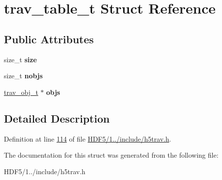 \hypertarget{structtrav__table__t}{}\section{trav\+\_\+table\+\_\+t Struct Reference}
\label{structtrav__table__t}
\subsection*{Public Attributes}
\begin{DoxyCompactItemize}
\item 
\mbox{\label{structtrav__table__t_a9df9cad12b6a3f75e5fd8242932d744b}} 
size\+\_\+t {\bfseries size}
\item 
\mbox{\label{structtrav__table__t_ab93a3974c69049e898372fd91e6759b9}} 
size\+\_\+t {\bfseries nobjs}
\item 
\mbox{\label{structtrav__table__t_ac3567e7df440c6a02705ad5b4b016633}} 
\hyperlink{structtrav__obj__t}{trav\+\_\+obj\+\_\+t} $\ast$ {\bfseries objs}
\end{DoxyCompactItemize}


\subsection{Detailed Description}


Definition at line \hyperlink{_h_d_f5_21_810_81_2include_2h5trav_8h_source_l00114}{114} of file \hyperlink{_h_d_f5_21_810_81_2include_2h5trav_8h_source}{H\+D\+F5/1../include/h5trav.\+h}.



The documentation for this struct was generated from the following file\+:\begin{DoxyCompactItemize}
\item 
H\+D\+F5/1../include/h5trav.\+h\end{DoxyCompactItemize}
